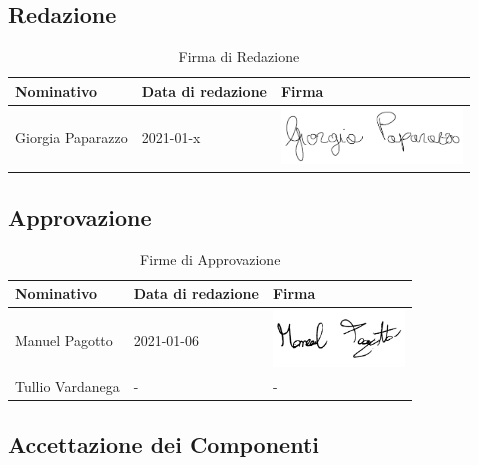 \documentclass[../piano_di_progetto.tex]{subfiles}
\begin{document}
\subsection{Redazione}%
\label{sub:red}

\begin{table}[!ht]
	\centering
	\begin{tabular}{|l|l|l|}
		\hline
		\rowcolor{lightgray}
		\textbf{Nominativo} & \textbf{Data di redazione} & \textbf{Firma} \\ 
		\hline
			Giorgia Paparazzo & 2021-01-x & \includegraphics[height=1.5cm]{componenti/img/firma_gp} \\
		\hline
	\end{tabular}
	\caption{Firma di Redazione}
\end{table}


\subsection{Approvazione}%
\label{sub:app}

\begin{table}[!ht]
	\centering
	\begin{tabular}{|l|l|l|}
		\hline
		\rowcolor{lightgray}
		\textbf{Nominativo} & \textbf{Data di redazione} & \textbf{Firma} \\ 

		\hline
			Manuel Pagotto & 2021-01-06 & \includegraphics[height=1.5cm]{componenti/img/firma_mp} \\
		\hline
			Tullio Vardanega & - & - \\
		\hline
	\end{tabular}
		\caption{Firme di Approvazione}
\end{table}


\newpage
\subsection{Accettazione dei Componenti}%
\label{sub:acc_comp}
\end{document}
